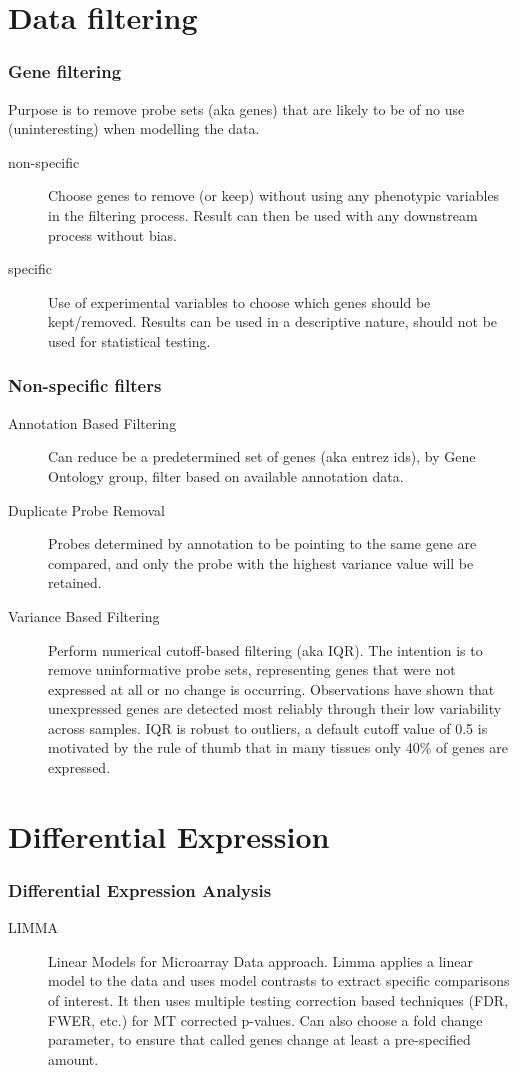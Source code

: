 \documentclass[pdf]{beamer}
\begin{document}
\section{Data filtering}

\begin{frame}
  \frametitle{Gene filtering}
  Purpose is to remove probe sets (aka genes) that are likely to be of no use (uninteresting) when modelling the data.
  \begin{description}
  \item[non-specific] Choose genes to remove (or keep) without using any phenotypic variables in the filtering process. Result can then be used with any downstream process without bias.
  \item[specific] Use of experimental variables to choose which genes should be kept/removed. Results can be used in a descriptive nature, should not be used for statistical testing.
 \end{description}
\end{frame}

\begin{frame}
  \frametitle{Non-specific filters}
  \begin{description}
  \item [Annotation Based Filtering] Can reduce be a predetermined set of genes (aka entrez ids), by Gene Ontology group, filter based on available annotation data. 
  \item [Duplicate Probe Removal] Probes determined by annotation to be pointing to the same gene are compared, and only the probe with the highest variance value will be retained.
  \item [Variance Based Filtering] Perform numerical cutoff-based filtering (aka IQR). The intention is to remove uninformative probe sets, representing genes that were not expressed at all or no change is occurring. Observations  have shown that unexpressed genes are detected most reliably through their low variability across samples. IQR is robust to outliers, a default cutoff value of 0.5 is motivated by the rule of thumb that in many tissues only 40\% of genes are expressed.
  \end{description}
\end{frame}
%

\section{Differential Expression}
\begin{frame}
  \frametitle{Differential Expression Analysis}
  \begin{description}
  \item [LIMMA] Linear Models for Microarray Data approach. Limma applies a linear model to the data and uses model contrasts to extract specific comparisons of interest. It then uses multiple testing correction based techniques (FDR, FWER, etc.) for MT corrected p-values. Can also choose a fold change parameter, to ensure that called genes change at least a pre-specified amount. 
  \end{description}
\end{frame}
\end{document}
